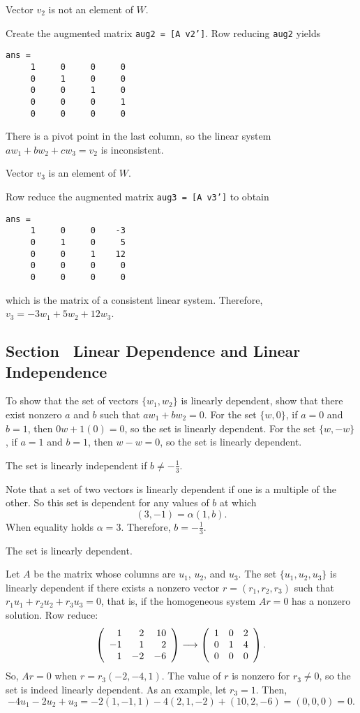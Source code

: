  \ans Vector $v_2$ is not an element of $W$.

\soln Create the augmented matrix {\tt aug2 = [A v2']}.  Row reducing
{\tt aug2} yields
\begin{verbatim}
ans =
     1     0     0     0
     0     1     0     0
     0     0     1     0
     0     0     0     1
     0     0     0     0
\end{verbatim}
There is a pivot point in the last column, so the linear system
$aw_1 + bw_2 + cw_3 = v_2$ is inconsistent.

 \ans Vector $v_3$ is an element of $W$.

\soln Row reduce the augmented matrix {\tt aug3 = [A v3']} to obtain
\begin{verbatim}
ans =
     1     0     0    -3
     0     1     0     5
     0     0     1    12
     0     0     0     0
     0     0     0     0
\end{verbatim}
which is the matrix of a consistent linear system.  Therefore,
$v_3 = -3w_1 + 5w_2 + 12w_3$.


\subsection*{Section~\protect{\ref{S:5.4}} Linear Dependence and Linear
Independence}

To show that the set of vectors $\{w_1,w_2\}$ is linearly dependent,
show that there exist nonzero $a$ and $b$ such that
$aw_1 + bw_2 = 0$.  For the set $\{w,0\}$, if $a = 0$ and $b = 1$,
then $0w + 1(0) = 0$, so the set is linearly dependent.  For the
set $\{w,-w\}$, if $a = 1$ and $b = 1$, then
$w - w = 0$, so the set is linearly dependent.

\ans The set is linearly independent if $b \neq -\frac{1}{3}$.

\soln Note that a set of two vectors is linearly dependent if one is
a multiple of the other.  So this set is dependent for any values of
$b$ at which
\[
(3,-1) = \alpha(1,b).
\]
When equality holds $\alpha = 3$.  Therefore, $b = -\frac{1}{3}$.  

\ans The set is linearly dependent.

\soln Let $A$ be the matrix whose columns are $u_1$, $u_2$, and $u_3$. 
The set $\{u_1,u_2,u_3\}$ is linearly dependent if there exists
a nonzero vector $r = (r_1,r_2,r_3)$ such that $r_1u_1 + r_2u_2 +
r_3u_3 = 0$, that is, if the homogeneous system $Ar = 0$ has a
nonzero solution.  Row reduce:
\[
\left(\begin{array}{rrr} 1 & 2 & 10 \\ -1 & 1 & 2 \\ 1 & -2 & -6\end{array}\right) \longrightarrow
\left(\begin{array}{rrr} 1 & 0 & 2 \\ 0 & 1 & 4 \\ 0 & 0 & 0\end{array}\right).
\]
So, $Ar = 0$ when $r = r_3(-2,-4,1)$.
The value of $r$ is nonzero for $r_3 \neq 0$, so the set is indeed
linearly dependent.
As an example, let $r_3 = 1$.  Then,
\[
-4u_1 - 2u_2 + u_3 = -2(1,-1,1) - 4(2,1,-2) + (10,2,-6) =
(0,0,0) = 0.
\]


